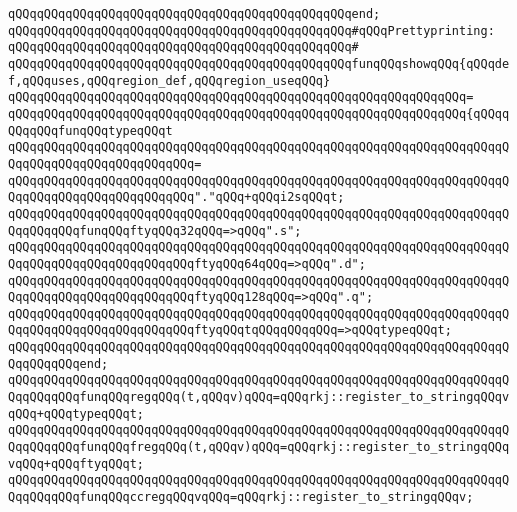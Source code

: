 \verb|qQQqqQQqqQQqqQQqqQQqqQQqqQQqqQQqqQQqqQQqqQQqqQQqend;|\newline
\newline
\newline
\verb|qQQqqQQqqQQqqQQqqQQqqQQqqQQqqQQqqQQqqQQqqQQqqQQq#qQQqPrettyprinting:|\newline
\verb|qQQqqQQqqQQqqQQqqQQqqQQqqQQqqQQqqQQqqQQqqQQqqQQq#|\newline
\verb|qQQqqQQqqQQqqQQqqQQqqQQqqQQqqQQqqQQqqQQqqQQqqQQqfunqQQqshowqQQq{qQQqdef,qQQquses,qQQqregion_def,qQQqregion_useqQQq}|\newline
\verb|qQQqqQQqqQQqqQQqqQQqqQQqqQQqqQQqqQQqqQQqqQQqqQQqqQQqqQQqqQQqqQQq=|\newline
\verb|qQQqqQQqqQQqqQQqqQQqqQQqqQQqqQQqqQQqqQQqqQQqqQQqqQQqqQQqqQQqqQQq{qQQqqQQqqQQqfunqQQqtypeqQQqt|\newline
\verb|qQQqqQQqqQQqqQQqqQQqqQQqqQQqqQQqqQQqqQQqqQQqqQQqqQQqqQQqqQQqqQQqqQQqqQQqqQQqqQQqqQQqqQQqqQQqqQQq=|\newline
\verb|qQQqqQQqqQQqqQQqqQQqqQQqqQQqqQQqqQQqqQQqqQQqqQQqqQQqqQQqqQQqqQQqqQQqqQQqqQQqqQQqqQQqqQQqqQQqqQQq"."qQQq+qQQqi2sqQQqt;|\newline
\newline
\verb|qQQqqQQqqQQqqQQqqQQqqQQqqQQqqQQqqQQqqQQqqQQqqQQqqQQqqQQqqQQqqQQqqQQqqQQqqQQqqQQqfunqQQqftyqQQq32qQQq=>qQQq".s";|\newline
\verb|qQQqqQQqqQQqqQQqqQQqqQQqqQQqqQQqqQQqqQQqqQQqqQQqqQQqqQQqqQQqqQQqqQQqqQQqqQQqqQQqqQQqqQQqqQQqqQQqftyqQQq64qQQq=>qQQq".d";|\newline
\verb|qQQqqQQqqQQqqQQqqQQqqQQqqQQqqQQqqQQqqQQqqQQqqQQqqQQqqQQqqQQqqQQqqQQqqQQqqQQqqQQqqQQqqQQqqQQqqQQqftyqQQq128qQQq=>qQQq".q";|\newline
\verb|qQQqqQQqqQQqqQQqqQQqqQQqqQQqqQQqqQQqqQQqqQQqqQQqqQQqqQQqqQQqqQQqqQQqqQQqqQQqqQQqqQQqqQQqqQQqqQQqftyqQQqtqQQqqQQqqQQq=>qQQqtypeqQQqt;|\newline
\verb|qQQqqQQqqQQqqQQqqQQqqQQqqQQqqQQqqQQqqQQqqQQqqQQqqQQqqQQqqQQqqQQqqQQqqQQqqQQqqQQqend;|\newline
\newline
\verb|qQQqqQQqqQQqqQQqqQQqqQQqqQQqqQQqqQQqqQQqqQQqqQQqqQQqqQQqqQQqqQQqqQQqqQQqqQQqqQQqfunqQQqregqQQq(t,qQQqv)qQQq=qQQqrkj::register_to_stringqQQqvqQQq+qQQqtypeqQQqt;|\newline
\verb|qQQqqQQqqQQqqQQqqQQqqQQqqQQqqQQqqQQqqQQqqQQqqQQqqQQqqQQqqQQqqQQqqQQqqQQqqQQqqQQqfunqQQqfregqQQq(t,qQQqv)qQQq=qQQqrkj::register_to_stringqQQqvqQQq+qQQqftyqQQqt;|\newline
\verb|qQQqqQQqqQQqqQQqqQQqqQQqqQQqqQQqqQQqqQQqqQQqqQQqqQQqqQQqqQQqqQQqqQQqqQQqqQQqqQQqfunqQQqccregqQQqvqQQq=qQQqrkj::register_to_stringqQQqv;|\newline
